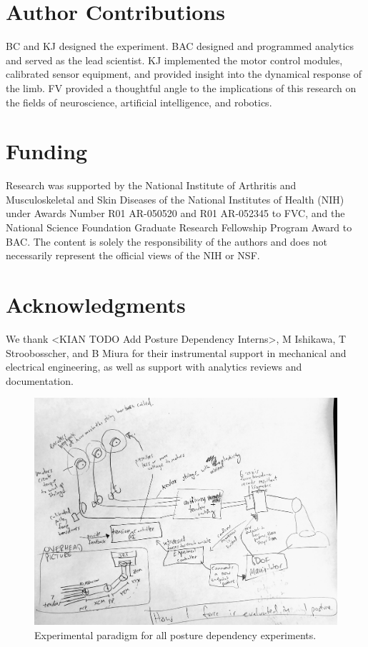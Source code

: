 \documentclass[utf8]{frontiersSCNS} %
\begin{document}
\section*{Author Contributions}
BC and KJ designed the experiment.
BAC designed and programmed analytics and served as the lead scientist.
KJ implemented the motor control modules, calibrated sensor equipment, and provided insight into the dynamical response of the limb.
FV provided a thoughtful angle to the implications of this research on the fields of neuroscience, artificial intelligence, and robotics.

\section*{Funding}
Research was supported by the National Institute of Arthritis and Musculoskeletal and Skin Diseases of
the National Institutes of Health (NIH) under Awards Number R01 AR-050520 and R01 AR-052345 to FVC, and
the National Science Foundation Graduate Research Fellowship Program Award to BAC.
The content is solely the responsibility of the authors and does not necessarily represent the official views of the NIH or NSF.

\section*{Acknowledgments}
We thank <KIAN TODO Add Posture Dependency Interns>, M Ishikawa, T Stroobosscher, and B Miura for their instrumental support in mechanical and electrical engineering, as well as support with analytics reviews and documentation.



\begin{figure}[h!]
\begin{center}
\includegraphics[width=17.5cm]{figures/overview/overview.jpg}%
\end{center}
\caption{Experimental paradigm for all posture dependency experiments.}
\label{fig:overview}
\end{figure}
\end{document}
